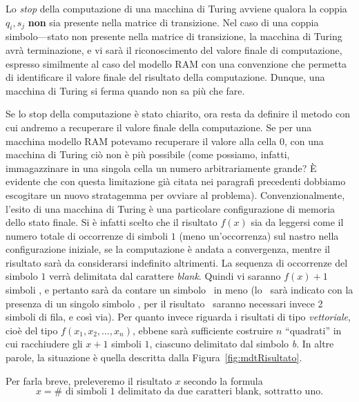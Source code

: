 \documentclass[10pt]{\classname}
\begin{document}
Lo \emph{stop} della computazione di una macchina di Turing avviene qualora la
coppia $q_i, s_j$ \textbf{non} sia presente nella matrice di transizione. Nel
caso di una coppia simbolo---stato non presente nella matrice di transizione,
la macchina di Turing avrà terminazione, e vi sarà il riconoscimento del valore
finale di computazione, espresso similmente al caso del modello RAM con una
convenzione che permetta di identificare il valore finale del risultato della
computazione. Dunque, una macchina di Turing si ferma quando non sa più che fare.

Se lo stop della computazione è stato chiarito, ora resta da definire il metodo
con cui andremo a recuperare il valore finale della computazione. Se per una
macchina modello RAM potevamo recuperare il valore alla cella 0, con una
macchina di Turing ciò non è più possibile (come possiamo, infatti,
immagazzinare in una singola cella un numero arbitrariamente grande? È evidente
che con questa limitazione già citata nei paragrafi precedenti dobbiamo
escogitare un nuovo stratagemma per ovviare al problema).
Convenzionalmente, l'esito di una macchina di Turing è una particolare
configurazione di memoria dello stato finale. Si è infatti scelto che
il risultato $f(x)$ sia da leggersi come il numero totale di occorrenze di simboli $1$
(meno un'occorrenza) sul nastro nella configurazione iniziale, se la computazione è
andata a convergenza, mentre il risultato sarà da considerarsi indefinito
altrimenti. La sequenza di occorrenze del simbolo $1$ verrà delimitata dal
carattere \emph{blank}. Quindi vi saranno $f(x) + 1$ simboli
\textquotesingle, e pertanto sarà da contare un simbolo
\textquotesingle\ in meno (lo
\textquotesingle\   sarà indicato con la presenza di un
singolo simbolo \textquotesingle, per il risultato
\textquotesingle\ saranno necessari invece 2 simboli
\textquotesingle di fila, e così via). Per quanto invece
riguarda i risultati di tipo \emph{vettoriale}, cioè del tipo
$f(x_1,x_2,\dots,x_n)$, ebbene sarà sufficiente costruire $n$ ``quadrati'' in
cui racchiudere gli $x+1$ simboli $1$, ciascuno delimitato dal simbolo
\emph{b}. In altre parole, la situazione è quella descritta dalla
Figura~\ref{fig:mdtRisultato}.

Per farla breve, preleveremo il risultato $x$ secondo la formula $$x = \# \mbox{ di simboli } 1 \mbox{ delimitato da due caratteri blank, sottratto uno}.$$
\end{document}
